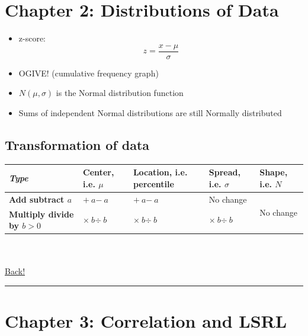 \documentclass[main]{subfiles}
\begin{document}
\section{Chapter 2: Distributions of Data}
\begin{itemize}
    \item z-score: \[z = \frac{x - \mu}{\sigma}\]
    \item OGIVE! (cumulative frequency graph)
    \item $N(\mu, \sigma)$ is the Normal distribution function
    \item Sums of independent Normal distributions are still Normally distributed
\end{itemize}

\subsection{Transformation of data}
\begin{tabular}{ | p{3.2cm} || p{2.5cm} | p{2.5cm} | p{2.5cm} | p{2.5cm} | }
    \hline
    \textbf{\textit{Type}} & \textbf{Center}, \newline i.e. $\mu$ & \textbf{Location}, \newline i.e. percentile & \textbf{Spread}, \newline i.e. $\sigma$ & \textbf{Shape}, \newline i.e. $N$ \\
    \hline
    \textbf{Add \newline subtract $a$} & $+\:a$\newline$-\:a$ & $+\:a$\newline$-\:a$ & No change & \multirow{2}{*}{No change} \\
    \cline{1-4}
    \textbf{Multiply \newline divide by $b > 0$} & $\times\:b$\newline$\div\:b$ & $\times\:b$\newline$\div\:b$ & $\times\:b$\newline$\div\:b$ & \\
    \hline
\end{tabular}
\\~\\
\noindent\hyperlink{toc}{Back!}
\newline\hrule

\section{Chapter 3: Correlation and LSRL}
\end{document}
